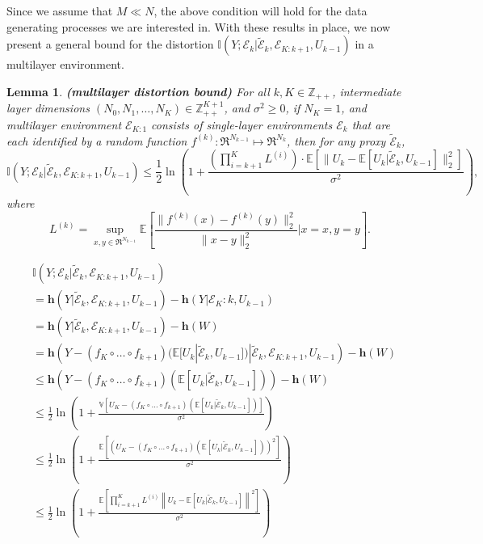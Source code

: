 \documentclass[twoside,11pt]{article}
\renewenvironment{proof}{\par\noindent{\bf Proof\ }}{\hfill\BlackBox\\[2mm]}
\newenvironment{proof}{\par\noindent{\bf Proof\ }}{\hfill\BlackBox\\[2mm]}
\newtheorem{lemma}[theorem]{Lemma}
\def\environment{\mathcal{E}}
\def\proxy{\tilde{\environment}}
\def\diffentropy{\bf h}
\def\var{\mathbb{V}}
\def\E{\mathbb{E}}
\def\diffentropy{\mathbf{h}}
\def\I{\mathbb{I}}
\begin{document}
Since we assume that $M \ll N$, the above condition will hold for the data generating processes we are interested in. With these results in place, we now present a general bound for the distortion $\I(Y;\environment_k|\proxy_k, \environment_{K:k+1}, U_{k-1})$ in a multilayer environment.

\begin{lemma}{\bf (multilayer distortion bound)}
    \label{le:dpe}
    For all $k, K\in\mathbb{Z}_{++}$, intermediate layer dimensions $(N_0, N_1, \hdots, N_K)\in\mathbb{Z}_{++}^{K+1}$, and $\sigma^2 \geq 0$, if $N_K = 1$, and multilayer environment $\environment_{K:1}$ consists of single-layer environments $\environment_k$ that are each identified by a random function $f^{(k)}: \Re^{N_{k-1}}\mapsto\Re^{N_k}$, then for any proxy $\proxy_k$,
    $$\I(Y;\environment_k|\proxy_k, \environment_{K:k+1}, U_{k-1})\leq \frac{1}{2}\ln\left(1 + \frac{\left(\prod_{i=k+1}^{K}L^{(i)}\right)\cdot\E\left[\|U_k - \E[U_k| \proxy_k, U_{k-1}]\|^2_2\right]}{\sigma^2}\right),$$
    where
    $$L^{(k)} = \sup_{x,y\in\Re^{N_{k-1}}}\E\left[\frac{\|f^{(k)}(x)-f^{(k)}(y)\|^2_2}{\|x-y\|^2_2}\Big|x=x, y=y\right].$$
\end{lemma}
\begin{proof}
    \begin{align*}
        & \I(Y;\environment_k|\proxy_k, \environment_{K:k+1}, U_{k-1})\\
        & = \diffentropy(Y|\proxy_k, \environment_{K:k+1}, U_{k-1}) - \diffentropy(Y|\environment_K:k,U_{k-1})\\
        & = \diffentropy(Y|\proxy_k, \environment_{K:k+1}, U_{k-1}) - \diffentropy(W)\\
        & = \diffentropy\left(Y-(f_K\circ\hdots\circ f_{k+1})(\E[U_k|\proxy_k, U_{k-1}])|\proxy_k, \environment_{K:k+1}, U_{k-1}\right) - \diffentropy(W)\\
        & \leq \diffentropy\left(Y-(f_K\circ\hdots\circ f_{k+1})(\E[U_k|\proxy_k, U_{k-1}])\right) - \diffentropy(W)\\
        & \leq \frac{1}{2}\ln\left(1 + \frac{\var\left[U_K - (f_K\circ\hdots\circ f_{k+1})(\E[U_k|\proxy_k, U_{k-1}])\right]}{\sigma^2}\right)\\
        & \leq \frac{1}{2}\ln\left(1 + \frac{\E\left[(U_K - (f_K\circ\hdots\circ f_{k+1})(\E[U_k|\proxy_k, U_{k-1}]))^2\right]}{\sigma^2}\right)\\
        & \leq \frac{1}{2}\ln\left(1 + \frac{\E\left[\prod_{i=k+1}^{K}L^{(i)}\left\|U_k - \E[U_k|\proxy_k, U_{k-1}]\right\|^2\right]}{\sigma^2}\right)\\
    \end{align*}
\end{proof}
\end{document}
